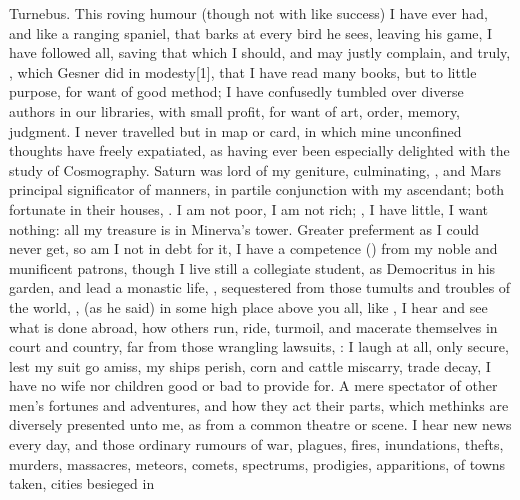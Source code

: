 {Turnebus. This roving humour (though not with like success) I have ever
had, and like a ranging spaniel, that barks at every bird he sees,
leaving his game, I have followed all, saving that which I should, and
may justly complain, and truly, , which
Gesner did in modesty[1\baselineskip], that I have read many books, but to little
purpose, for want of good method; I have confusedly tumbled over diverse
authors in our libraries, with small profit, for want of art, order,
memory, judgment. I never travelled but in map or card, in which mine
unconfined thoughts have freely expatiated, as having ever been
especially delighted with the study of Cosmography. Saturn was lord
of my geniture, culminating, \etc, and Mars principal significator of
manners, in partile conjunction with my ascendant; both fortunate in
their houses, \etc. I am not poor, I am not rich; ,
I have little, I want nothing: all my treasure is in Minerva's tower.
Greater preferment as I could never get, so am I not in debt for it, I
have a competence () from my noble and munificent patrons,
though I live still a collegiate student, as Democritus in his garden,
and lead a monastic life, , sequestered from those
tumults and troubles of the world, ,
(as he said) in some high place above you all, like , I hear and see what is done abroad, how others run, ride,
turmoil, and macerate themselves in court and country, far from those
wrangling lawsuits, : I laugh at all, only secure, lest my suit go amiss, my ships
perish, corn and cattle miscarry, trade decay, I have no wife nor
children good or bad to provide for. A mere spectator of other men's
fortunes and adventures, and how they act their parts, which methinks
are diversely presented unto me, as from a common theatre or scene. I
hear new news every day, and those ordinary rumours of war, plagues,
fires, inundations, thefts, murders, massacres, meteors, comets,
spectrums, prodigies, apparitions, of towns taken, cities besieged in
}
